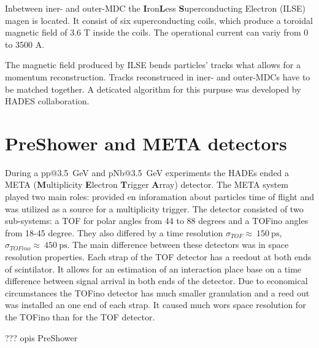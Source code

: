 Inbetween iner- and outer-MDC the \textbf{I}ron\textbf{L}ess \textbf{S}uperconducting Electron (ILSE) magen is located. It consist of six superconducting coils, which produce a toroidal magnetic field of 3.6 T inside the coils. The operational current can variy from 0 to 3500 A. 

The magnetic field produced by ILSE bends particles' tracks what allows for a momentum reconstruction. Tracks reconstruced in iner- and outer-MDCs have to be matched together. A deticated algorithm for this purpuse was developed by HADES collaboration. 

\section{PreShower and META detectors}
During a pp@3.5~GeV and pNb@3.5~GeV experiments the HADEs ended a META (\textbf{M}ultiplicity \textbf{E}lectron \textbf{T}rigger \textbf{A}rray) detector. The META system played two main roles: provided en inforamation about particles time of flight and was utilized as a source for a multiplicity trigger. The detector consisted of two sub-systems: a TOF for polar angles from 44 to 88 degrees and a TOFino angles from 18-45 degree. They also differed by a time resolution $\sigma_{TOF}\approx~150~\mathrm{ps}$, $\sigma_{TOFino}\approx~450~\mathrm{ps}$. The main difference between these detectors was in space resolution properties. Each strap of the TOF detector has a reedout at both ends of scintilator. It allows for an estimation of an interaction place base on a time difference between signal arrival in both ends of the detector. Due to economical circumstances the TOFino detector has much smaller granulation and a reed out was installed an one end of each strap. It caused much wors space resolution for the TOFino than for the TOF detector.

??? opis PreShower

